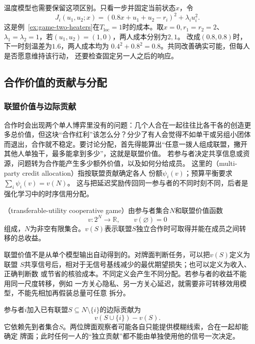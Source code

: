 温度模型也需要保留这项区别。只看一步并固定当前状态\(x\)，令
\[
  J_i(u_1,u_2;x)
  =(0.8x+u_1+u_2-r_i)^2+\lambda_i u_i^2.
\]
这是例~\ref{ex:game-two-heaters}在\(T_{\mathrm{loc}}=1\)时的成本。取\(x=0,r_1=r_2=2\)、
\(\lambda_1=\lambda_2=1\)，若\((u_1,u_2)=(1,0)\)，两人成本分别为\(2,1\)。
改成\((0.8,0.8)\)时，下一时刻温差为\(1.6\)，两人成本均为
\(0.4^2+0.8^2=0.8\)。共同改善确实可能，但每人是否愿意维持该行动，
还要检查固定另一人之后的响应。

\subsection{合作价值的贡献与分配}
\label{sec:game-credit-allocation-multiparty-payoffs}

\subsubsection{联盟价值与边际贡献}
\label{sec:game-coalition-value}

合作时会出现两个单人博弈里没有的问题：几个人合在一起往往比各干各的创造更多总价值，但这块“合作红利”该怎么分？分少了有人会觉得不如单干或另组小团体而退出，合作就不稳定。要讨论分配，首先得能算出“任意一拨人组成联盟，撇开其他人单独干，最多能拿到多少”，这就是联盟价值。
若参与者决定共享信息或资源，问题转为合作能产生多少额外价值，以及如何分给成员。
这里的（multi-party credit allocation）指按联盟贡献确定各人
份额\(\psi_i(v)\)；预算平衡要求\(\sum_i\psi_i(v)=v(N)\)。
这与把延迟奖励传回同一参与者的不同时刻不同，后者是强化学习中的时序信用分配。
\begin{definition}[可转移效用博弈]
\label{def:game-transferable-utility-cooperation}
（transferable-utility cooperative game）由参与者集合\(N\)和联盟价值函数
\[
  v:2^N\to\mathbb{R},\qquad v(\varnothing)=0
\]
组成，$N$为非空有限集合。\(v(S)\)表示联盟\(S\)独立合作时可取得并能在成员之间转移的总收益。
\end{definition}

联盟价值不是从单个模型输出自动得到的。对牌面判断任务，可以把\(v(S)\)定义为联盟
\(S\)共享信号后，相对于无信号基线减少的最优期望损失；也可以定义为收入、正确判断数
或节省的核验成本。不同定义会产生不同分配。若参与者的收益不能用同一尺度转移，例如
一方关心隐私、另一方关心延迟，就需要非可转移效用模型，不能先相加再假装总量可任意
拆分。

参与者\(i\)加入已有联盟\(S\subseteq N\setminus\{i\}\)的边际贡献为
\[
  v(S\cup\{i\})-v(S).
\]
它依赖先到者集合\(S\)。两位牌面观察者可能各自只能提供模糊线索，合在一起却能确定
牌面；此时任何一人的“独立贡献”都不能由单独使用他的信号一次决定。

